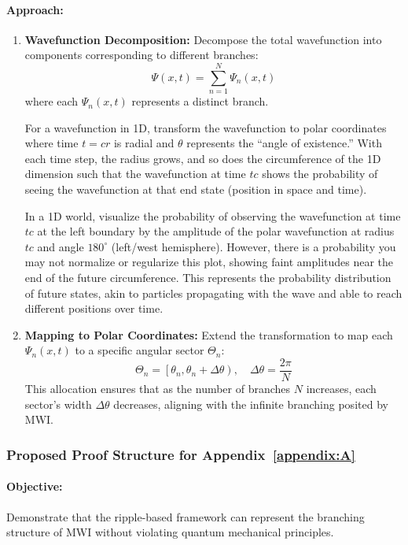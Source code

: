 \documentclass[12pt]{article}
\begin{document}
\paragraph{Approach:}
\begin{enumerate}
    \item \textbf{Wavefunction Decomposition:}
    Decompose the total wavefunction into components corresponding to different branches:
    \[
    \Psi(x,t) = \sum_{n=1}^{N} \Psi_n(x,t)
    \]
    where each \(\Psi_n(x,t)\) represents a distinct branch.
    
    For a wavefunction in 1D, transform the wavefunction to polar coordinates where time \(t = cr\) is radial and \(\theta\) represents the “angle of existence.” With each time step, the radius grows, and so does the circumference of the 1D dimension such that the wavefunction at time \(tc\) shows the probability of seeing the wavefunction at that end state (position in space and time).
    
    In a 1D world, visualize the probability of observing the wavefunction at time \(tc\) at the left boundary by the amplitude of the polar wavefunction at radius \(tc\) and angle \(180^\circ\) (left/west hemisphere). However, there is a probability you may not normalize or regularize this plot, showing faint amplitudes near the end of the future circumference. This represents the probability distribution of future states, akin to particles propagating with the wave and able to reach different positions over time.
    
    \item \textbf{Mapping to Polar Coordinates:}
    Extend the transformation to map each \(\Psi_n(x,t)\) to a specific angular sector \(\Theta_n\):
    \[
    \Theta_n = \left[\theta_n, \theta_n + \Delta\theta\right), \quad \Delta\theta = \frac{2\pi}{N}
    \]
    This allocation ensures that as the number of branches \(N\) increases, each sector's width \(\Delta\theta\) decreases, aligning with the infinite branching posited by MWI.
\end{enumerate}

\subsubsection{Proposed Proof Structure for Appendix~\ref{appendix:A}}
\paragraph{Objective:} Demonstrate that the ripple-based framework can represent the branching structure of MWI without violating quantum mechanical principles.
\end{document}
